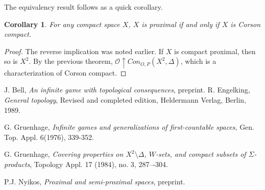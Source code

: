 \documentclass{amsart}
\newtheorem{cor}[thm]{Corollary}
\theoremstyle{definition}
\theoremstyle{remark}
\newcommand{\<}{\langle}
\renewcommand{\>}{\rangle}
\newcommand{\congame}[2]{Con_{O,P}(#1,#2)}
\newcommand{\pl}[1]{\mathscr{#1}}
\newcommand{\win}{\uparrow}
\begin{document}
The equivalency result follows as a quick corollary.

\begin{cor}
  For any compact space $X$, $X$ is proximal if and only if $X$ is Corson compact.
\end{cor}

\begin{proof}
  The reverse implication was noted earlier. If $X$ is compact proximal, then so is $X^2$. By the previous theorem, $\pl O\win\congame{X^2}{\Delta}$, which is a characterization of Corson compact.
\end{proof}




\begin{thebibliography}{99}
 J. Bell,
  \emph{An infinite game with topological consequences}, preprint.
  R. Engelking,
  \emph{General topology}, Revised and completed edition, Heldermann Verlag, Berlin, 1989.


 G. Gruenhage,
  \emph{Infinite games and generalizations of first-countable spaces}, Gen. Top. Appl. 6(1976), 339-352.

  G. Gruenhage,
  \emph{Covering properties on $X^2\setminus\Delta$, $W$-sets, and compact subsets of $\Sigma$-products},
  Topology Appl. 17 (1984), no. 3, 287–-304.


  P.J. Nyikos,
  \emph{Proximal and semi-proximal spaces}, preprint.
\end{thebibliography}
\end{document}
